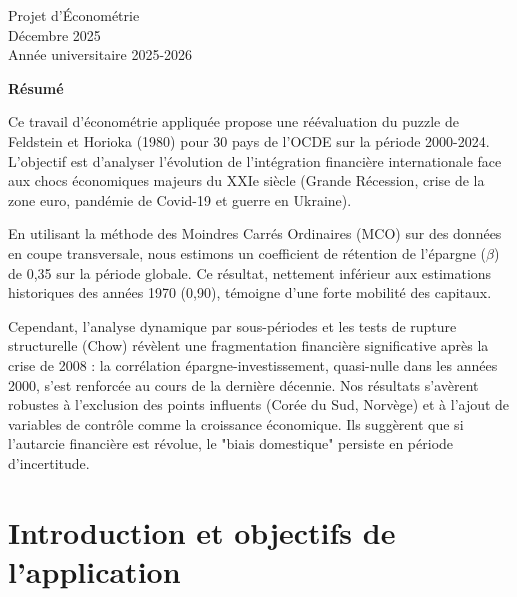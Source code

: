 \documentclass[12pt, a4paper]{article}
\begin{document}
\begin{titlepage}
    \vfill
    
    {\large Projet d'Économétrie}\\
    \vspace{0.2cm}
    {\large Décembre 2025}\\
    \vspace{0.2cm}
    {\large Année universitaire 2025-2026}
    
\end{titlepage}
\newpage

\thispagestyle{empty}
\vspace*{1cm}

\begin{center}
    \Large\textbf{Résumé}
\end{center}

Ce travail d’économétrie appliquée propose une réévaluation du puzzle de Feldstein et Horioka (1980) pour 30 pays de l’OCDE sur la période 2000-2024. L'objectif est d'analyser l'évolution de l'intégration financière internationale face aux chocs économiques majeurs du XXIe siècle (Grande Récession, crise de la zone euro, pandémie de Covid-19 et guerre en Ukraine).

En utilisant la méthode des Moindres Carrés Ordinaires (MCO) sur des données en coupe transversale, nous estimons un coefficient de rétention de l'épargne ($\beta$) de 0,35 sur la période globale. Ce résultat, nettement inférieur aux estimations historiques des années 1970 (0,90), témoigne d'une forte mobilité des capitaux. 

Cependant, l'analyse dynamique par sous-périodes et les tests de rupture structurelle (Chow) révèlent une fragmentation financière significative après la crise de 2008 : la corrélation épargne-investissement, quasi-nulle dans les années 2000, s'est renforcée au cours de la dernière décennie. Nos résultats s'avèrent robustes à l'exclusion des points influents (Corée du Sud, Norvège) et à l'ajout de variables de contrôle comme la croissance économique. Ils suggèrent que si l'autarcie financière est révolue, le "biais domestique" persiste en période d'incertitude.


\newpage
\section{ Introduction et objectifs de l'application}
\end{document}
